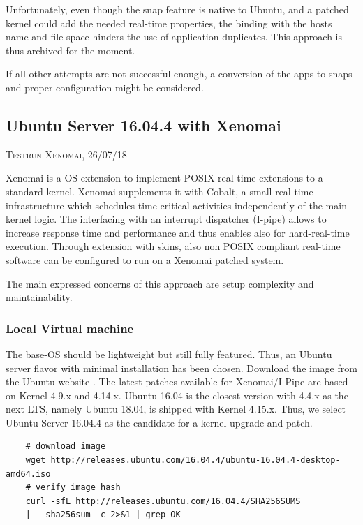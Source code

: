 \documentclass[]{scrartcl}
\begin{document}
Unfortunately, even though the snap feature is native to Ubuntu, and a patched kernel could add the needed real-time properties, the binding with the hosts name and file-space hinders the use of application duplicates. This approach is thus archived for the moment.

If all other attempts are not successful enough, a conversion of the apps to snaps and proper configuration might be considered.

\subsection{Ubuntu Server 16.04.4 with Xenomai}

{\small\textsc{Testrun Xenomai, 26/07/18} \bigskip}

Xenomai is a OS extension to implement POSIX real-time extensions to a standard kernel. Xenomai supplements it with Cobalt, a small real-time infrastructure which schedules time-critical activities independently of the main kernel logic. The interfacing with an interrupt dispatcher (I-pipe) allows to increase response time and performance and thus enables also for hard-real-time execution. Through extension with skins, also non POSIX compliant real-time software can be configured to run on a Xenomai patched system.

The main expressed concerns of this approach are setup complexity and maintainability.

\subsubsection{Local Virtual machine}
\label{sec:xenoinst}

The base-OS should be lightweight but still fully featured. Thus, an Ubuntu server flavor with minimal installation has been chosen. Download the image from the Ubuntu website \cite{ubuntu02}. The latest patches available for Xenomai/I-Pipe are based on Kernel 4.9.x and 4.14.x. Ubuntu 16.04 is the closest version with 4.4.x as the next LTS, namely Ubuntu 18.04, is shipped with Kernel 4.15.x. Thus, we select Ubuntu Server 16.04.4 as the candidate for a kernel upgrade and patch.

\begin{verbatim}
	# download image
	wget http://releases.ubuntu.com/16.04.4/ubuntu-16.04.4-desktop-amd64.iso
	# verify image hash
	curl -sfL http://releases.ubuntu.com/16.04.4/SHA256SUMS
	|	sha256sum -c 2>&1 | grep OK
\end{verbatim}
\end{document}
